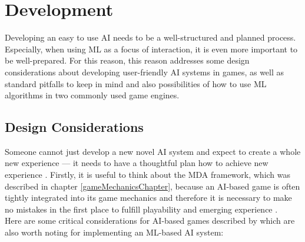 \documentclass[MGS,Master,english]{twbook}%
\begin{document}
\section{Development} \label{mlDevelopment}
Developing an easy to use AI needs to be a well-structured and planned process. Especially, when using ML as a focus of interaction, it is even more important to be well-prepared. For this reason, this reason addresses some design considerations about developing user-friendly AI systems in games, as well as standard pitfalls to keep in mind and also possibilities of how to use ML algorithms in two commonly used game engines.

\subsection{Design Considerations}
Someone cannot just develop a new novel AI system and expect to create a whole new experience — it needs to have a thoughtful plan how to achieve new experience \cite{ai::gameDesign}. Firstly, it is useful to think about the MDA framework, which was described in chapter \ref{gameMechanicsChapter}, because an AI-based game is often tightly integrated into its game mechanics and therefore it is necessary to make no mistakes in the first place to fulfill playability and emerging experience \cite{ai::gameDesign}. \\
Here are some critical considerations for AI-based games described by \cite{ai::gameDesign} which are also worth noting for implementing an ML-based AI system: 
\end{document}
